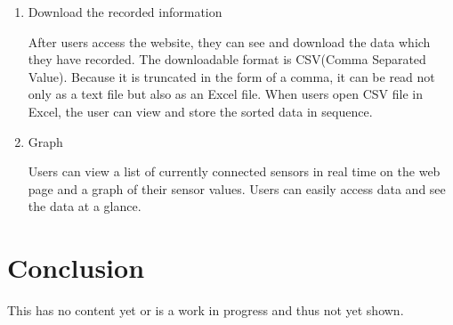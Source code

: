 \documentclass[conference]{IEEEtran}
\begin{document}
\begin{enumerate}
\begin{enumerate}
\begin{enumerate}
				\item Download the recorded information

					After users access the website, they can see and download the data which they have recorded. The downloadable format is CSV(Comma Separated Value). Because it is truncated in the form of a comma, it can be read not only as a text file but also as an Excel file. When users open CSV file in Excel, the user can view and store the sorted data in sequence.\\

				\item Graph

					Users can view a list of currently connected sensors in real time on the web page and a graph of their sensor values. Users can easily access data and see the data at a glance.\\
			\end{enumerate}
		\end{enumerate}
 	\end{enumerate}
\section{Conclusion}
	This has no content yet or is a work in progress and thus not yet shown.
\end{document}
